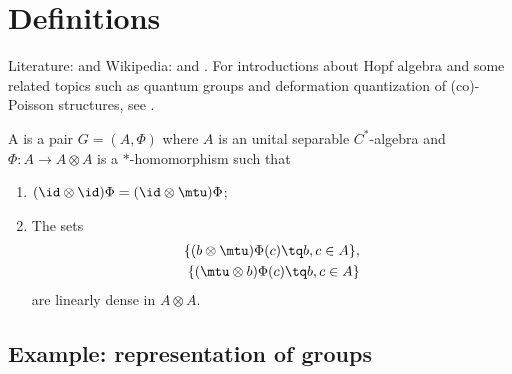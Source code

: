 
\section{Definitions}

Literature: \cite{CompactQuantumGpWoro,Ritter,Koelink,Kustermans} and Wikipedia:  and . For introductions about Hopf algebra and some related topics such as quantum groups and deformation quantization of (co)-Poisson structures, see \cite{Tjin,MaximeRey}.

\begin{definition}
    A  is a pair $G=(A,\Phi)$ where $A$ is an unital separable $C^*$-algebra and $\Phi\colon A\to A\otimes A$ is a $*$-homomorphism such that
    \begin{enumerate}
        \item
            $(\id\otimes\id)\Phi=(\id\otimes\mtu)\Phi$;
        \item
            The sets
            \begin{equation}
                \begin{aligned}[]
                    \{ (b\otimes\mtu)\Phi(c)\tq b,c\in A \},\\
                    \{ (\mtu\otimes b)\Phi(c)\tq b,c\in A \}
                \end{aligned}
            \end{equation}
            are linearly dense in $A\otimes A$.
    \end{enumerate}
\end{definition}

\subsection{Example: representation of groups}

